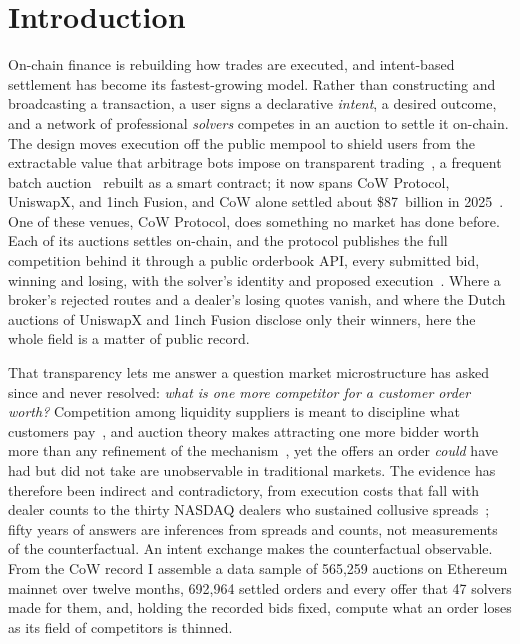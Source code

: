 \documentclass[11pt]{article}
\theoremstyle{plain}
\theoremstyle{definition}
\theoremstyle{remark}
\begin{document}
\section{Introduction}

On-chain finance is rebuilding how trades are executed, and intent-based settlement has become its fastest-growing model. Rather than constructing and broadcasting a transaction, a user signs a declarative \emph{intent}, a desired outcome, and a network of professional \emph{solvers} competes in an auction to settle it on-chain. The design moves execution off the public mempool to shield users from the extractable value that arbitrage bots impose on transparent trading~\citep{daian2020flashboys}, a frequent batch auction~\citep{budish2015hft} rebuilt as a smart contract; it now spans CoW Protocol, UniswapX, and 1inch Fusion, and CoW alone settled about \$87~billion in 2025~\citep{cowdao_review2025}. One of these venues, CoW Protocol, does something no market has done before. Each of its auctions settles on-chain, and the protocol publishes the full competition behind it through a public orderbook API, every submitted bid, winning and losing, with the solver's identity and proposed execution~\citep{cow_api}. Where a broker's rejected routes and a dealer's losing quotes vanish, and where the Dutch auctions of UniswapX and 1inch Fusion disclose only their winners, here the whole field is a matter of public record.

That transparency lets me answer a question market microstructure has asked since \citet{demsetz1968cost} and never resolved: \emph{what is one more competitor for a customer order worth?} Competition among liquidity suppliers is meant to discipline what customers pay~\citep{ho1983dynamics}, and auction theory makes attracting one more bidder worth more than any refinement of the mechanism~\citep{bulow1996auctions}, yet the offers an order \emph{could} have had but did not take are unobservable in traditional markets. The evidence has therefore been indirect and contradictory, from execution costs that fall with dealer counts to the thirty NASDAQ dealers who sustained collusive spreads~\citep{christie1994nasdaq}; fifty years of answers are inferences from spreads and counts, not measurements of the counterfactual. An intent exchange makes the counterfactual observable. From the CoW record I assemble a data sample of 565{,}259 auctions on Ethereum mainnet over twelve months, 692{,}964 settled orders and every offer that 47 solvers made for them, and, holding the recorded bids fixed, compute what an order loses as its field of competitors is thinned.
\end{document}
